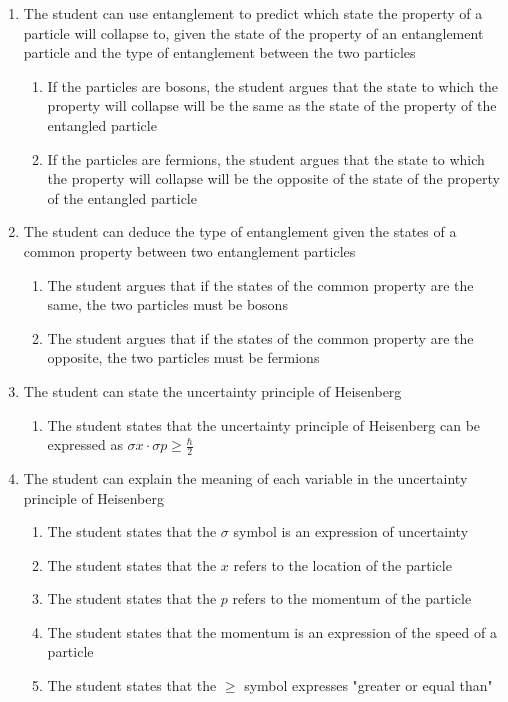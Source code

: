 \documentclass[11pt,twoside]{report} %
\begin{document}
\begin{enumerate}
\begin{enumerate}
\end{enumerate}
\item The student can use entanglement to predict which state the property of a particle will collapse to, given the state of the property of an entanglement particle and the type of entanglement between the two particles
\begin{enumerate}
\item If the particles are bosons, the student argues that the state to which the property will collapse will be the same as the state of the property of the entangled particle
\item If the particles are fermions, the student argues that the state to which the property will collapse will be the opposite of the state of the property of the entangled particle
\end{enumerate}
\item The student can deduce the type of entanglement given the states of a common property between two entanglement particles
\begin{enumerate}
\item The student argues that if the states of the common property are the same, the two particles must be bosons
\item The student argues that if the states of the common property are the opposite, the two particles must be fermions
\end{enumerate}
\item The student can state the uncertainty principle of Heisenberg
\begin{enumerate}
\item The student states that the uncertainty principle of Heisenberg can be expressed as $\sigma x  \cdot\sigma p \geq \frac{\hbar}{2}$
\end{enumerate}
\item The student can explain the meaning of each variable in the uncertainty principle of Heisenberg
\begin{enumerate}
\item The student states that the $\sigma$ symbol is an expression of uncertainty
\item The student states that the $x$ refers to the location of the particle
\item The student states that the $p$ refers to the momentum of the particle
\item The student states that the momentum is an expression of the speed of a particle
\item The student states that the $\geq$ symbol expresses "greater or equal than"

\end{enumerate}
\end{enumerate}
\end{document}
